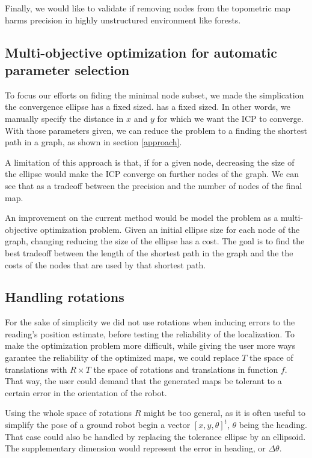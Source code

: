 \documentclass[letterpaper,10 pt,conference]{ieeeconf}
\begin{document}
Finally, we would like to validate if removing nodes from the topometric map harms precision in highly unstructured environment like forests.

\subsection{Multi-objective optimization for automatic parameter selection}

To focus our efforts on fiding the minimal node subset, we made the simplication the convergence ellipse has a fixed sized.
has a fixed sized.  In other words, we manually specify the distance in $x$ and $y$ for which we
want the ICP to converge. With those parameters given, we can reduce the problem to a finding the
shortest path in a graph, as shown in section \ref{approach}.


A limitation of this approach is that, if for a given node, decreasing the size of the ellipse would
make the ICP converge on further nodes of the graph. We can see that as a tradeoff between the
precision and the number of nodes of the final map.


An improvement on the current method would be model the problem as a multi-objective optimization
problem. Given an initial ellipse size for each node of the graph, changing reducing the size of the
ellipse has a cost. The goal is to find the best tradeoff between the length of the shortest path in
the graph and the the costs of the nodes that are used by that shortest path.

\subsection{Handling rotations}

For the sake of simplicity we did not use rotations when inducing errors to the reading's
position estimate, before testing the reliability of the localization. To make the optimization
problem more difficult, while giving the user more ways garantee the reliability of the optimized
maps, we could replace $T$ the space of translations with $R \times T$ the space of rotations and
translations in function $f$. That way, the user could demand that the generated maps be tolerant to
a certain error in the orientation of the robot.

Using the whole space of rotations $R$ might be too general, as it is often useful to simplify the pose of a
ground robot begin a vector $[x, y, \theta]^t$, $\theta$ being the heading. That case could also be
handled by replacing the tolerance ellipse by an ellipsoid. The supplementary dimension would
represent the error in heading, or $\Delta \theta$.
\end{document}
